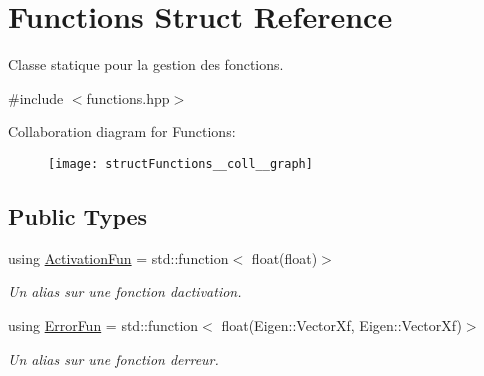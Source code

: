 \hypertarget{structFunctions}{}\section{Functions Struct Reference}
\label{structFunctions}


Classe statique pour la gestion des fonctions.  




{\ttfamily \#include $<$functions.\+hpp$>$}



Collaboration diagram for Functions\+:\nopagebreak
\begin{figure}[H]
\begin{center}
\leavevmode
\texttt{[image: structFunctions\_\_coll\_\_graph]}
\end{center}
\end{figure}
\subsection*{Public Types}
\begin{DoxyCompactItemize}
\item 
using \hyperlink{structFunctions_ad25362ffa52b2f7933431190546593ac}{Activation\+Fun} = std\+::function$<$ float(float)$>$
\begin{DoxyCompactList}\small\item\em Un alias sur une fonction d\textquotesingle{}activation. \end{DoxyCompactList}\item 
using \hyperlink{structFunctions_a834bc4170f1caa8c77272ecf51dbae5c}{Error\+Fun} = std\+::function$<$ float(Eigen\+::\+Vector\+Xf, Eigen\+::\+Vector\+Xf)$>$
\begin{DoxyCompactList}\small\item\em Un alias sur une fonction d\textquotesingle{}erreur. \end{DoxyCompactList}\end{DoxyCompactItemize}
